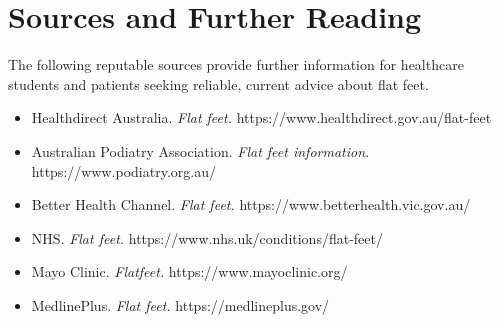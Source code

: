 \section*{Sources and Further Reading}
The following reputable sources provide further information for healthcare students and patients seeking reliable, current advice about flat feet.
\begin{itemize}
    \item Healthdirect Australia. \textit{Flat feet.} https://www.healthdirect.gov.au/flat-feet
    \item Australian Podiatry Association. \textit{Flat feet information.} https://www.podiatry.org.au/
    \item Better Health Channel. \textit{Flat feet.} https://www.betterhealth.vic.gov.au/
    \item NHS. \textit{Flat feet.} https://www.nhs.uk/conditions/flat-feet/
    \item Mayo Clinic. \textit{Flatfeet.} https://www.mayoclinic.org/
    \item MedlinePlus. \textit{Flat feet.} https://medlineplus.gov/
\end{itemize}
